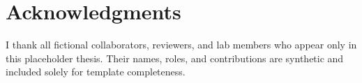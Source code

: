\chapter*{Acknowledgments}

I thank all fictional collaborators, reviewers, and lab members who appear only in this placeholder thesis. Their names, roles, and contributions are synthetic and included solely for template completeness.
